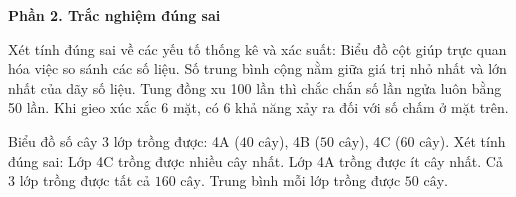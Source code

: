 \textbf{Phần 2. Trắc nghiệm đúng sai}

\begin{ex} %
Xét tính đúng sai về các yếu tố thống kê và xác suất:
\choiceTF
{\True Biểu đồ cột giúp trực quan hóa việc so sánh các số liệu.}
{\True Số trung bình cộng nằm giữa giá trị nhỏ nhất và lớn nhất của dãy số liệu.}
{Tung đồng xu 100 lần thì chắc chắn số lần ngửa luôn bằng 50 lần.}
{\True Khi gieo xúc xắc 6 mặt, có 6 khả năng xảy ra đối với số chấm ở mặt trên.}
\end{ex}

\begin{ex} %
Biểu đồ số cây 3 lớp trồng được: 4A ($40\text{ cây}$), 4B ($50\text{ cây}$), 4C ($60\text{ cây}$). Xét tính đúng sai:
\choiceTF
{\True Lớp 4C trồng được nhiều cây nhất.}
{\True Lớp 4A trồng được ít cây nhất.}
{Cả 3 lớp trồng được tất cả $160\text{ cây}$.}
{\True Trung bình mỗi lớp trồng được $50\text{ cây}$.}
\end{ex}

